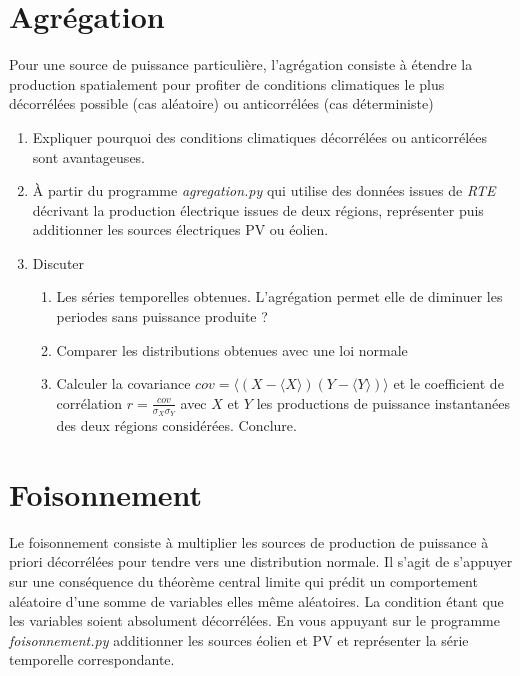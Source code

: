 \documentclass[12pt,a4]{article}
\newcommand{\tmtextit}[1]{{\itshape{#1}}}
\begin{document}
\section{Agrégation}

Pour une source de puissance particulière, l'agrégation consiste à étendre la production spatialement pour profiter de conditions climatiques le plus décorrélées possible (cas aléatoire) ou anticorrélées (cas déterministe)
\begin{enumerate}
	\item Expliquer pourquoi des conditions climatiques décorrélées ou anticorrélées sont avantageuses.
	
  \item À partir du programme \tmtextit{agregation.py} qui utilise des
  données issues de \tmtextit{RTE} décrivant la production électrique
  issues de deux régions, représenter puis additionner les sources
  électriques PV ou éolien.
  
  \item Discuter
  \begin{enumerate}
    \item Les séries temporelles obtenues. L'agrégation permet elle de
    diminuer les periodes sans puissance produite ?
    
    \item Comparer les distributions obtenues avec une loi normale
    
    \item Calculer la covariance $cov=\langle (X-\langle X \rangle)(Y - \langle Y \rangle)\rangle $ et le coefficient de corrélation $r=\frac{cov}{\sigma_X \sigma_Y}$ avec $X$ et $Y$ les productions de puissance instantanées des deux régions considérées. Conclure.
  \end{enumerate}
\end{enumerate}

\section{Foisonnement}

Le foisonnement consiste à multiplier les sources de production de puissance
à priori décorrélées pour tendre vers une distribution normale. Il s'agit de s'appuyer sur une conséquence du théorème central limite qui prédit un
comportement aléatoire d'une somme de variables elles même aléatoires. La
condition étant que les variables soient absolument décorrélées. En vous
appuyant sur le programme \tmtextit{foisonnement.py} additionner les sources
éolien et PV et représenter la série temporelle correspondante.
\end{document}
